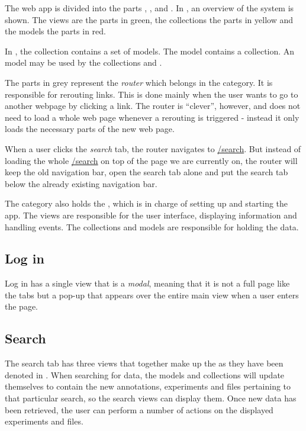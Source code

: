 The web app is divided into the parts , ,  and . In , an overview of the system is shown. The views are the parts in green, the collections the parts in yellow and the models the parts in red. 

\begin{example}
In , the collection  contains a set of  models. The model  contains a  collection. An  model may be used by the collections  and .
\end{example}

The parts in grey represent the \textit{router} which belongs in the  category. It is responsible for rerouting links. This is done mainly when the user wants to go to another webpage by clicking a link. The router is “clever”, however, and does not need to load a whole web page whenever a rerouting is triggered - instead it only loads the necessary parts of the new web page.

\begin{example}
When a user clicks the \textit{search} tab, the router navigates to \url{/search}. But instead of loading the whole \url{/search} on top of the page we are currently on, the router will keep the old navigation bar, open the search tab alone and put the search tab below the already existing navigation bar.
\end{example}

The  category also holds the , which is in charge of setting up and starting the app. The views are responsible for the user interface, displaying information and handling events. The collections and models are responsible for holding the data.

\subsection{Log in}
Log in has a single view that is a \textit{modal}, meaning that it is not a full page like the tabs but a pop-up that appears over the entire main view when a user enters the page.

\label{sec:web_search}
\subsection{Search}
The search tab has three views that together make up the  as they have been denoted in . When searching for data, the models and collections will update themselves to contain the new annotations, experiments and files pertaining to that particular search, so the search views can display them. Once new data has been retrieved, the user can perform a number of actions on the displayed experiments and files. 


